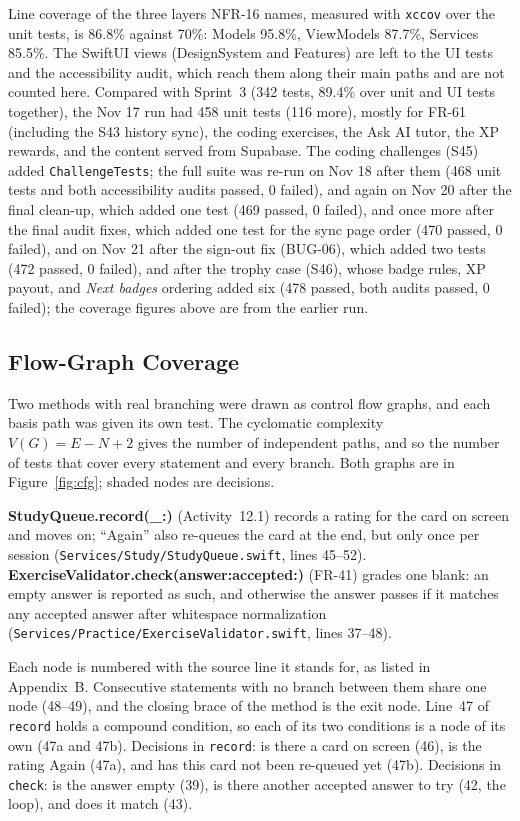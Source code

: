 \documentclass[12pt,letterpaper]{article}
\begin{document}
Line coverage of the three layers NFR-16 names, measured with \texttt{xccov} over the
unit tests, is 86.8\% against 70\%: Models 95.8\%, ViewModels 87.7\%, Services
85.5\%. The SwiftUI views (DesignSystem and Features) are left to the UI tests and the
accessibility audit, which reach them along their main paths and are not counted
here. Compared with Sprint~3 (342 tests, 89.4\% over unit and UI tests together),
the Nov 17 run had 458 unit tests (116 more), mostly for FR-61 (including the S43 history sync), the coding exercises, the Ask AI
tutor, the XP rewards, and the content served from Supabase. The coding challenges
(S45) added \texttt{ChallengeTests}; the full suite was re-run on Nov 18 after them
(468 unit tests and both accessibility audits passed, 0 failed), and again on Nov 20 after the final
clean-up, which added one test (469 passed, 0 failed), and once more after the final audit
fixes, which added one test for the sync page order (470 passed, 0 failed), and on Nov 21
after the sign-out fix (BUG-06), which added two tests (472 passed, 0 failed), and after the trophy case (S46), whose badge
rules, XP payout, and \emph{Next badges} ordering added six (478 passed, both audits
passed, 0 failed); the coverage figures above are from the earlier run.

\subsection{Flow-Graph Coverage}\label{sec:flowgraph}
Two methods with real branching were drawn as control flow graphs, and each basis
path was given its own test. The cyclomatic complexity $V(G) = E - N + 2$ gives the
number of independent paths, and so the number of tests that cover every statement
and every branch. Both graphs are in Figure~\ref{fig:cfg}; shaded nodes are
decisions.

\textbf{StudyQueue.record(\_:)} (Activity~12.1) records a rating for the card on
screen and moves on; ``Again'' also re-queues the card at the end, but only once per
session (\texttt{Services/Study/StudyQueue.swift}, lines 45--52). \textbf{ExerciseValidator.check(answer:accepted:)} (FR-41) grades
one blank: an empty answer is reported as such, and otherwise the answer passes if it
matches any accepted answer after whitespace normalization
(\texttt{Services/Practice/ExerciseValidator.swift}, lines 37--48).

Each node is numbered with the source line it stands for, as listed in Appendix~B.
Consecutive statements with no branch between them share one node (48--49), and the
closing brace of the method is the exit node. Line~47 of \texttt{record} holds a
compound condition, so each of its two conditions is a node of its own (47a and 47b).
Decisions in \texttt{record}: is there a card on screen (46), is the rating Again
(47a), and has this card not been re-queued yet (47b). Decisions in \texttt{check}: is
the answer empty (39), is there another accepted answer to try (42, the loop), and
does it match (43).
\end{document}
